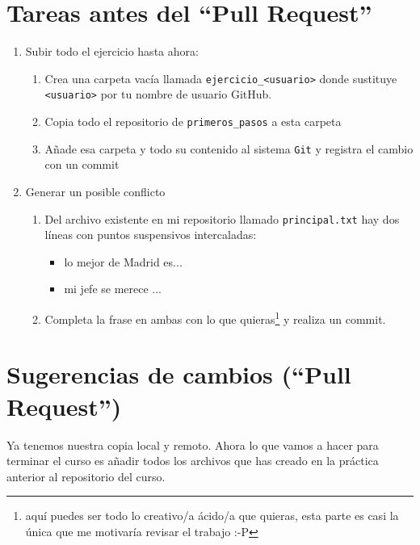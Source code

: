 \documentclass[a4paper,11pt]{report}
\newcommand{\cverb}{\Verb}
\begin{document}
    \section{Tareas antes del ``Pull Request''}
    \begin{enumerate}
     \item Subir todo el ejercicio hasta ahora:
     \begin{enumerate}
	     \item Crea una carpeta vacía llamada \cverb+ejercicio_<usuario>+ donde sustituye \cverb+<usuario>+ por tu nombre de usuario GitHub.

	     \item Copia todo el repositorio de \verb+primeros_pasos+ a esta carpeta

	     \item Añade esa carpeta y todo su contenido al sistema \verb+Git+ y registra el cambio con un commit
     \end{enumerate}
     \item Generar un posible conflicto
     \begin{enumerate}
	     \item Del archivo existente en mi repositorio llamado \verb+principal.txt+ hay dos líneas con puntos suspensivos intercaladas:
      \begin{itemize}
       \item lo mejor de Madrid es...
       \item mi jefe se merece ...
      \end{itemize}
      \item Completa la frase en ambas con lo que quieras\footnote{aquí puedes ser todo lo creativo/a ácido/a que quieras, esta parte es casi la única que me motivaría revisar el trabajo :-P} y realiza un commit.
     \end{enumerate}
    \end{enumerate}

    \section{Sugerencias de cambios (``Pull Request'')}
    Ya tenemos nuestra copia local y remoto. Ahora lo que vamos a hacer para terminar el curso es añadir todos los archivos que has creado en la práctica anterior al repositorio del curso.
    
\end{document}

